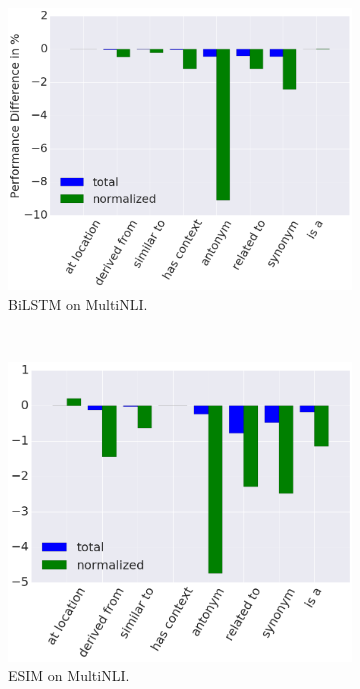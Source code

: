 \documentclass[11pt,a4paper]{article}
\begin{document}
\begin{figure}[ht!]
\begin{subfigure}{0.32\textwidth}
\includegraphics[width=\textwidth]{perf_diff_bilstm_mnli.png}
\caption{BiLSTM on MultiNLI.}
\end{subfigure}~
\begin{subfigure}{0.3\textwidth}
\includegraphics[width=\textwidth]{perf_diff_esim_mnli.png}
\caption{ESIM on MultiNLI.}
\end{subfigure}~
\begin{subfigure}{0.3\textwidth}

\end{subfigure}
\end{figure}
\end{document}
